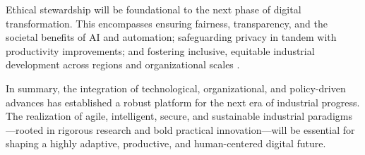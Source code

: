 Ethical stewardship will be foundational to the next phase of digital transformation. This encompasses ensuring fairness, transparency, and the societal benefits of AI and automation; safeguarding privacy in tandem with productivity improvements; and fostering inclusive, equitable industrial development across regions and organizational scales \cite{ref35}\cite{ref41}\cite{ref90}.

In summary, the integration of technological, organizational, and policy-driven advances has established a robust platform for the next era of industrial progress. The realization of agile, intelligent, secure, and sustainable industrial paradigms—rooted in rigorous research and bold practical innovation—will be essential for shaping a highly adaptive, productive, and human-centered digital future.
